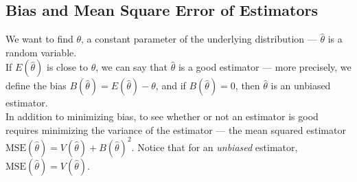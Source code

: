\documentclass[10pt]{extarticle}
\begin{document}
  \subsection{Bias and Mean Square Error of Estimators}%
  We want to find $\theta$, a constant parameter of the underlying distribution --- $\hat{\theta}$ is a random variable.\\

  If $E(\hat{\theta})$ is close to $\theta$, we can say that $\hat{\theta}$ is a good estimator --- more precisely, we define the bias $B(\hat{\theta}) = E(\hat{\theta})-\theta$, and if $B(\hat{\theta}) = 0$, then $\hat{\theta}$ is an unbiased estimator.\\

  In addition to minimizing bias, to see whether or not an estimator is good requires minimizing the variance of the estimator --- the mean squared estimator $\text{MSE}(\hat{\theta}) = V(\hat{\theta}) + B(\hat{\theta})^2$. Notice that for an \textit{unbiased} estimator, $\text{MSE}(\hat{\theta}) = V(\hat{\theta})$.
\end{document}
